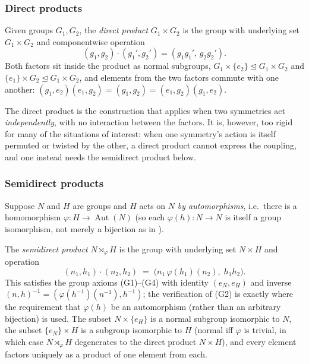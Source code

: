 \documentclass[mathematics,review,submit,moreauthors]{Definitions/mdpi}
\begin{document}
\subsubsection{Direct products}
\label{subsubsec:direct-products}

\begin{Definition}
\label{def:direct-product}
Given groups $G_1, G_2$, the \emph{direct product} $G_1 \times G_2$ is the
group with underlying set $G_1 \times G_2$ and componentwise operation
\[
    (g_1, g_2) \cdot (g_1', g_2') = (g_1 g_1',\, g_2 g_2').
\]
Both factors sit inside the product as normal subgroups,
$G_1 \times \{e_2\} \trianglelefteq G_1 \times G_2$ and
$\{e_1\} \times G_2 \trianglelefteq G_1 \times G_2$, and elements from the
two factors commute with one another: $(g_1,e_2)(e_1,g_2) = (g_1,g_2) =
(e_1,g_2)(g_1,e_2)$.
\end{Definition}

The direct product is the construction that applies when two symmetries act
\emph{independently}, with no interaction between the factors. It is,
however, too rigid for many of the situations of interest: when one
symmetry's action is itself permuted or twisted by the other, a direct
product cannot express the coupling, and one instead needs the semidirect
product below.

\subsubsection{Semidirect products}
\label{subsubsec:semidirect-products}

Suppose $N$ and $H$ are groups and $H$ acts on $N$ \emph{by automorphisms},
i.e.\ there is a homomorphism $\varphi : H \to \operatorname{Aut}(N)$ (so each
$\varphi(h) : N \to N$ is itself a group isomorphism, not merely a bijection
as in ).

\begin{Definition}
\label{def:semidirect-product}
The \emph{semidirect product} $N \rtimes_\varphi H$ is the group with
underlying set $N \times H$ and operation
\[
    (n_1, h_1) \cdot (n_2, h_2) \;=\; \bigl(n_1 \, \varphi(h_1)(n_2),\; h_1 h_2 \bigr).
\]
This satisfies the group axioms (G1)--(G4) with identity $(e_N, e_H)$ and
inverse $(n,h)^{-1} = (\varphi(h^{-1})(n^{-1}), h^{-1})$; the verification of
(G2) is exactly where the requirement that $\varphi(h)$ be an automorphism
(rather than an arbitrary bijection) is used. The subset
$N \times \{e_H\}$ is a normal subgroup isomorphic to $N$, the subset
$\{e_N\} \times H$ is a subgroup isomorphic to $H$ (normal iff $\varphi$ is
trivial, in which case $N \rtimes_\varphi H$ degenerates to the direct
product $N \times H$), and every element factors uniquely as a product of
one element from each.
\end{Definition}
\end{document}
